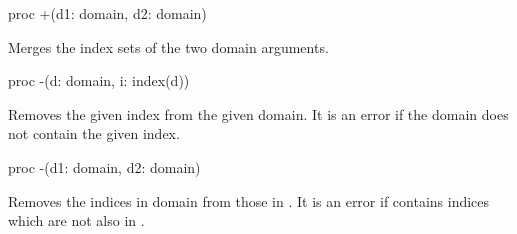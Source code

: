 \begin{protohead}
proc +(d1: domain, d2: domain)
\end{protohead}
\begin{protobody}
Merges the index sets of the two domain arguments.
\end{protobody}

\begin{protohead}
proc -(d: domain, i: index(d))
\end{protohead}
\begin{protobody}
Removes the given index from the given domain.  It is an error if the domain
does not contain the given index.
\end{protobody}

\begin{protohead}
proc -(d1: domain, d2: domain)
\end{protohead}
\begin{protobody}
Removes the indices in domain  from those in .  It is an error
if  contains indices which are not also in .
\end{protobody}
